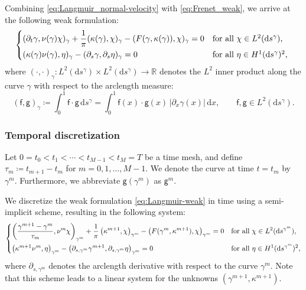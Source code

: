 \documentclass{article}
\theoremstyle{remark}
\theoremstyle{definition}
\numberwithin{equation}{section}
\begin{document}
Combining \eqref{eq:Langmuir_normal-velocity} with \eqref{eq:Frenet_weak}, we arrive at the following weak formulation:
\begin{equation}
    \begin{dcases*}
        (\partial_t \gamma, \nu(\gamma) \chi)_{\gamma} + \frac{1}{\pi}(\kappa(\gamma), \chi)_{\gamma} - (F(\gamma,\kappa(\gamma)), \chi)_{\gamma} = 0 & for all $\chi \in L^2(\mathrm{d}s^\gamma)$, \\
        (\kappa(\gamma) \nu(\gamma), \eta)_{\gamma} - (\partial_s \gamma, \partial_s \eta)_{\gamma} = 0 & for all $\eta \in H^1(\mathrm{d}s^\gamma)^2$,
    \end{dcases*}
    \label{eq:Langmuir-weak}
\end{equation}
where $(\cdot, \cdot)_{\gamma} \colon L^2(\mathrm{d}s^\gamma) \times L^2(\mathrm{d}s^\gamma) \to \mathbb{R}$ denotes the $L^2$ inner product along the curve $\gamma$ with respect to the arclength measure:
\begin{equation*}
    (\mathsf{f}, \mathsf{g})_{\gamma}
    \coloneqq \int_0^1 \mathsf{f} \cdot \mathsf{g}\, \mathrm{d}s^\gamma
    = \int_0^1 \mathsf{f}(x) \cdot \mathsf{g}(x)\, |\partial_x \gamma(x)|\, \mathrm{d}x,
    \qquad \mathsf{f}, \mathsf{g} \in L^2(\mathrm{d}s^\gamma).
\end{equation*}

\subsubsection{Temporal discretization}

Let $0 = t_0 < t_1 < \cdots < t_{M-1} < t_M = T$ be a time mesh, and define $\tau_m \coloneqq t_{m+1} - t_m$ for $m = 0, 1, \ldots, M-1$.
We denote the curve at time $t = t_m$ by $\gamma^m$.
Furthermore, we abbreviate $\mathsf{g}(\gamma^m)$ as $\mathsf{g}^m$.

We discretize the weak formulation \eqref{eq:Langmuir-weak} in time using a semi-implicit scheme, resulting in the following system:
\begin{equation}
    \begin{dcases}
        \left( \frac{\gamma^{m+1} - \gamma^m}{\tau_m}, \nu^m \chi \right)_{\gamma^m}
        + \frac{1}{\pi} \left( \kappa^{m+1}, \chi \right)_{\gamma^m}
        - \left( F(\gamma^m,\kappa^{m+1}), \chi \right)_{\gamma^m} = 0
        & \text{for all } \chi \in L^2(\mathrm{d}s^{\gamma^m}), \\
        \left( \kappa^{m+1} \nu^m, \eta \right)_{\gamma^m}
        - \left( \partial_{s,\gamma^m} \gamma^{m+1}, \partial_{s,\gamma^m} \eta \right)_{\gamma^m}
        = 0
        & \text{for all } \eta \in H^1(\mathrm{d}s^{\gamma^m})^2,
    \end{dcases}
    \label{eq:Langmuir-weak_time-discrete}
\end{equation}
where $\partial_{s,\gamma^m}$ denotes the arclength derivative with respect to the curve $\gamma^m$. Note that this scheme leads to a linear system for the unknowns $(\gamma^{m+1}, \kappa^{m+1})$.
\end{document}
